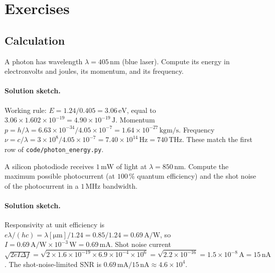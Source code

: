 \section{Exercises}

\subsection*{Calculation}

\begin{exercise}
A photon has wavelength $\lambda = 405\,\si{\nano\meter}$ (blue
laser). Compute its energy in electronvolts and joules, its momentum,
and its frequency.
\paragraph{Solution sketch.} Working rule: $E = 1.24/0.405 = 3.06\,\si{
\electronvolt}$, equal to $3.06 \times 1.602\times 10^{-19} = 4.90\times
10^{-19}\,\si{\joule}$. Momentum $p = h/\lambda = 6.63\times 10^{-34}/
4.05\times 10^{-7} = 1.64\times 10^{-27}\,\si{\kilogram\meter\per
\second}$. Frequency $\nu = c/\lambda = 3\times 10^{8}/4.05\times 10^{-7}
= 7.40\times 10^{14}\,\si{\hertz} = 740\,\si{\tera\hertz}$. These match
the first row of \texttt{code/photon\_energy.py}.
\end{exercise}

\begin{exercise}
A silicon photodiode receives $1\,\si{\milli\watt}$ of light at
$\lambda = 850\,\si{\nano\meter}$. Compute the maximum possible
photocurrent (at $100\,\%$ quantum efficiency) and the shot noise of
the photocurrent in a $1\,\si{\mega\hertz}$ bandwidth.
\paragraph{Solution sketch.} Responsivity at unit efficiency is
$e\lambda/(hc) = \lambda[\si{\micro\meter}]/1.24 = 0.85/1.24 = 0.69\,\si{
\ampere\per\watt}$, so $I = 0.69\,\si{\ampere\per\watt}\times 10^{-3}\,
\si{\watt} = 0.69\,\si{\milli\ampere}$. Shot noise current $\sqrt{2eI
\Delta f} = \sqrt{2\times 1.6\times 10^{-19}\times 6.9\times 10^{-4}
\times 10^{6}} = \sqrt{2.2\times 10^{-16}} = 1.5\times 10^{-8}\,\si{
\ampere} = 15\,\si{\nano\ampere}$. The shot-noise-limited SNR is
$0.69\,\si{\milli\ampere}/15\,\si{\nano\ampere} \approx 4.6\times 10^{4}$.
\end{exercise}

